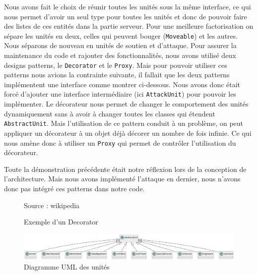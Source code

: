 Nous avons fait le choix de réunir toutes les unités sous la même interface, ce qui nous permet d'avoir un seul type pour toutes les unités et donc de pouvoir faire des listes de ces entités dans la partie serveur.
Pour une meilleure factorisation on sépare les unités en deux, celles qui peuvent bouger (\lstinline{Moveable}) et les autres. Nous séparons de nouveau en unités de soutien et d'attaque. Pour assurer la maintenance du code et rajouter des fonctionnalités, nous avons utilisé deux designs patterns, le \lstinline{Decorator} et le \lstinline{Proxy}. Mais pour pouvoir utiliser ces patterns nous avions la contrainte suivante, il fallait que les deux patterns implémentent une interface comme montrer ci-dessous. Nous avons donc était forcé d'ajouter une interface intermédiaire (ici \lstinline{AttackUnit}) pour pouvoir les implémenter. Le décorateur nous permet de changer le comportement des unités dynamiquement sans à avoir à changer toutes les classes qui étendent \lstinline{AbstractUnit}. Mais l'utilisation de ce pattern conduit à un problème, on peut appliquer un décorateur à un objet déjà décorer un nombre de fois infinie. Ce qui nous amène donc à utiliser un \lstinline{Proxy} qui permet de contrôler l'utilisation du décorateur.

Toute la démonstration précédente était notre réflexion lors de la conception de l'architecture. Mais nous avons implémenté l'attaque en dernier, nous n'avons donc pas intégré ces patterns dans notre code.

\begin{figure}[H]
    \centering
    \def\stackalignment{r}
           {\scriptsize%
            Source : wikipedia}
    \caption{Exemple d'un Decorator}
    \label{fig:UML_Decorator_Pattern_Exmple}
\end{figure}


\begin{figure}[H]
    \centering
    \includegraphics[scale=0.3]{data/uml_abstract_unit.png}
    \caption{Diagramme UML des unités}
    \label{fig:uml_abstract_unit}
\end{figure}

